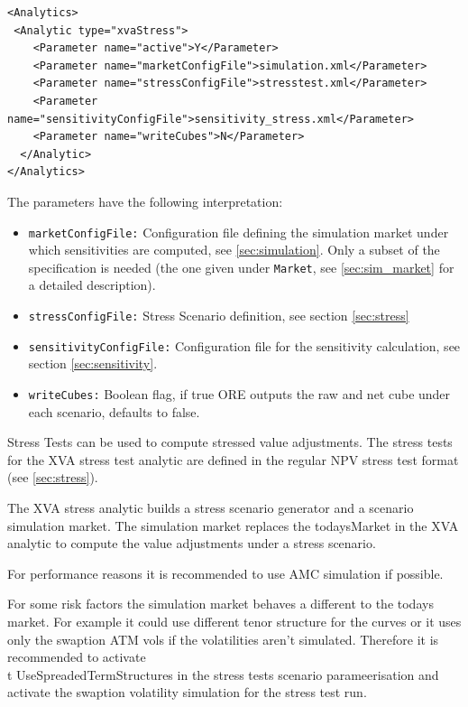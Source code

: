 \begin{listing}[H]
\begin{verbatim}
<Analytics>
 <Analytic type="xvaStress">
    <Parameter name="active">Y</Parameter>
    <Parameter name="marketConfigFile">simulation.xml</Parameter>
    <Parameter name="stressConfigFile">stresstest.xml</Parameter>
    <Parameter name="sensitivityConfigFile">sensitivity_stress.xml</Parameter>
    <Parameter name="writeCubes">N</Parameter>
  </Analytic>
</Analytics>
\end{verbatim}
\caption{ORE analytic: XVA stress}
\label{lst:ore_xva_stress}
\end{listing}

The parameters have the following interpretation:

\begin{itemize}
\item {\tt marketConfigFile:} Configuration file defining the simulation market under which sensitivities are computed,
  see \ref{sec:simulation}. Only a subset of the specification is needed (the one given under {\tt Market}, see
  \ref{sec:sim_market} for a detailed description).
  \item {\tt stressConfigFile:} Stress Scenario definition, see section \ref{sec:stress}
  \item {\tt sensitivityConfigFile:} Configuration file  for the sensitivity calculation, see section \ref{sec:sensitivity}.
  \item {\tt writeCubes:} Boolean flag, if true ORE outputs the raw and net cube under each scenario, defaults to false.
\end{itemize}

Stress Tests can be used to compute stressed value adjustments. The stress tests for the XVA stress test analytic are
defined in the regular NPV stress test format (see \ref{sec:stress}).

The XVA stress analytic builds a stress scenario generator and a scenario simulation market. The simulation market
replaces the todaysMarket in the XVA analytic to compute the value adjustments under a stress scenario.

For performance reasons it is recommended to use AMC simulation if possible.

For some risk factors the simulation market behaves a different to the todays market. For example it could use different
tenor structure for the curves or it uses only the swaption ATM vols if the volatilities aren't simulated.
Therefore it is recommended to activate {\\t UseSpreadedTermStructures} in the stress tests scenario parameerisation
and activate the swaption volatility simulation for the stress test run.


